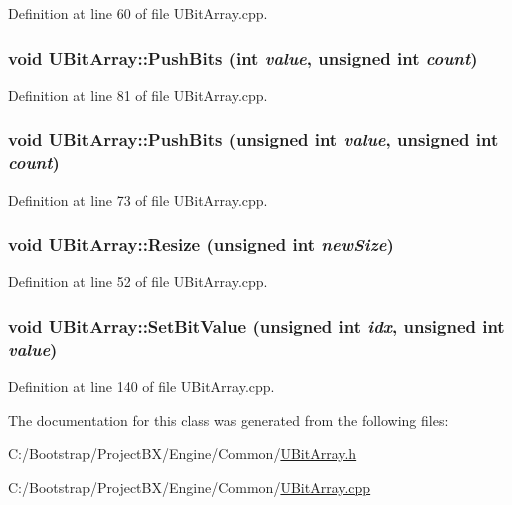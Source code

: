 Definition at line 60 of file UBitArray.cpp.\hypertarget{class_u_bit_array_7a8e2cda64a7b0813a78520e3d4e7174}{
\subsubsection[{PushBits}]{\setlength{\rightskip}{0pt plus 5cm}void UBitArray::PushBits (int {\em value}, \/  unsigned int {\em count})}}
\label{class_u_bit_array_7a8e2cda64a7b0813a78520e3d4e7174}




Definition at line 81 of file UBitArray.cpp.\hypertarget{class_u_bit_array_4f1baeb839a973bacdb02ffffe2bd6a8}{
\subsubsection[{PushBits}]{\setlength{\rightskip}{0pt plus 5cm}void UBitArray::PushBits (unsigned int {\em value}, \/  unsigned int {\em count})}}
\label{class_u_bit_array_4f1baeb839a973bacdb02ffffe2bd6a8}




Definition at line 73 of file UBitArray.cpp.\hypertarget{class_u_bit_array_d6e3884e3d3cc1f8c2882c0e3d181b89}{
\subsubsection[{Resize}]{\setlength{\rightskip}{0pt plus 5cm}void UBitArray::Resize (unsigned int {\em newSize})}}
\label{class_u_bit_array_d6e3884e3d3cc1f8c2882c0e3d181b89}




Definition at line 52 of file UBitArray.cpp.\hypertarget{class_u_bit_array_a265435baf940dc2f48ba9b38b51229f}{
\subsubsection[{SetBitValue}]{\setlength{\rightskip}{0pt plus 5cm}void UBitArray::SetBitValue (unsigned int {\em idx}, \/  unsigned int {\em value})}}
\label{class_u_bit_array_a265435baf940dc2f48ba9b38b51229f}




Definition at line 140 of file UBitArray.cpp.

The documentation for this class was generated from the following files:\begin{CompactItemize}
\item 
C:/Bootstrap/ProjectBX/Engine/Common/\hyperlink{_u_bit_array_8h}{UBitArray.h}\item 
C:/Bootstrap/ProjectBX/Engine/Common/\hyperlink{_u_bit_array_8cpp}{UBitArray.cpp}\end{CompactItemize}
